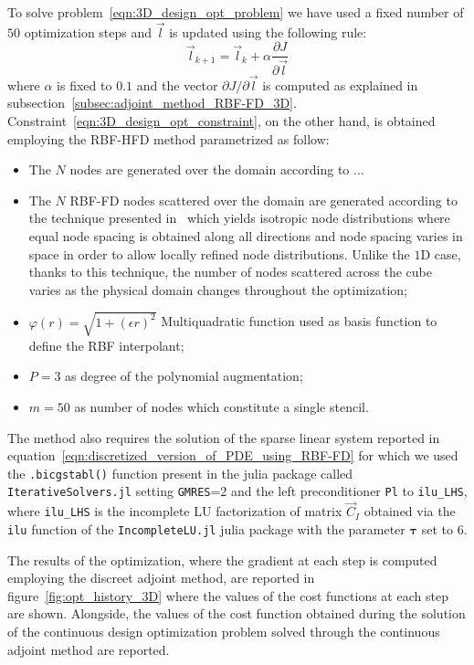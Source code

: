 \medskip
To solve problem~\eqref{eqn:3D_design_opt_problem} we have used a fixed number of $50$ optimization steps and $\vec{l}$ is updated using the following rule:
\begin{equation}
	\vec{l}_{k+1} = \vec{l}_k + \alpha \frac{\partial J}{\partial \vec{l}}
\end{equation}
where $\alpha$ is fixed to $0.1$ and the vector $\partial J / \partial \vec{l}$ is computed as explained in subsection~\ref{subsec:adjoint_method_RBF-FD_3D}.
Constraint~\eqref{eqn:3D_design_opt_constraint}, on the other hand, is obtained employing the RBF-HFD method parametrized as follow:
\begin{itemize}
	\item The $N$ nodes are generated over the domain according to  ...
	\item The $N$ RBF-FD nodes scattered over the domain are generated according to the technique presented in~\cite{Zamolo:phd_thesis} which yields isotropic node distributions where equal node spacing is obtained along all directions and node spacing varies in space in order to allow locally refined node distributions. Unlike the $1$D case, thanks to this technique, the number of nodes scattered across the cube varies as the physical domain changes throughout the optimization;
	\item $\varphi(r) = \sqrt{1 + (\epsilon r)^2}$ Multiquadratic function used as basis function to define the RBF interpolant;
	\item $P = 3$ as degree of the polynomial augmentation;
	\item $m = 50$ as number of nodes which constitute a single stencil.  %
\end{itemize}
The method also requires the solution of the sparse linear system reported in equation~\eqref{eqn:discretized_version_of_PDE_using_RBF-FD} for which we used the \verb|.bicgstabl()| function present in the julia package called \verb|IterativeSolvers.jl| setting \verb|GMRES|=2 and the left preconditioner \verb|Pl| to \verb|ilu_LHS|, where \verb|ilu_LHS| is the incomplete LU factorization of matrix $\vec{C}_I$ obtained via the \verb|ilu| function of the \verb|IncompleteLU.jl| julia package with the parameter $\boldsymbol{\tau}$ set to $6$.

The results of the optimization, where the gradient at each step is computed employing the discreet adjoint method, are reported in figure~\ref{fig:opt_history_3D} where the values of the cost functions at each step are shown. Alongside, the values of the cost function obtained during the solution of the continuous design optimization problem solved through the continuous adjoint method are reported.

